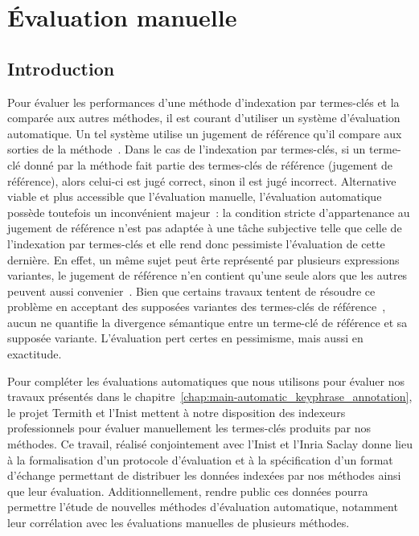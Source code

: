 \chapter{Évaluation manuelle}
\label{chap:main-manuelle_evaluation_of_keyphrase_annotation}

  \section{Introduction}
  \label{sec:main-automatic_evaluation_of_keyphrase_annotation-introduction}
    Pour évaluer les performances d'une méthode d'indexation par termes-clés et
    la comparée aux autres méthodes, il est courant d'utiliser un système
    d'évaluation automatique. Un tel système utilise un jugement de référence
    qu'il compare aux sorties de la méthode~\cite{voorhees2002philosophy}. Dans
    le cas de l'indexation par termes-clés, si un terme-clé donné par la méthode
    fait partie des termes-clés de référence (jugement de référence), alors
    celui-ci est jugé correct, sinon il est jugé incorrect. Alternative viable
    et plus accessible que l'évaluation manuelle, l'évaluation automatique
    possède toutefois un inconvénient majeur~: la condition stricte
    d'appartenance au jugement de référence n'est pas adaptée à une tâche
    subjective telle que celle de l'indexation par termes-clés et elle rend donc
    pessimiste l'évaluation de cette dernière. En effet, un même sujet peut êrte
    représenté par plusieurs expressions variantes, le jugement de référence
    n'en contient qu'une seule alors que les autres peuvent aussi
    convenier~\cite{hasan2014state_of_the_art}. Bien que certains travaux
    tentent de résoudre ce problème en acceptant des supposées variantes des
    termes-clés de référence~\cite{zesch2009rprecision,kim2010rprecision}, aucun
    ne quantifie la divergence sémantique entre un terme-clé de référence et sa
    supposée variante. L'évaluation pert certes en pessimisme, mais aussi en
    exactitude.
    
    Pour compléter les évaluations automatiques que nous utilisons pour évaluer
    nos travaux présentés dans le
    chapitre~\ref{chap:main-automatic_keyphrase_annotation}, le projet Termith
    et l'Inist mettent à notre disposition des indexeurs professionnels pour
    évaluer manuellement les termes-clés produits par nos méthodes. Ce travail,
    réalisé conjointement avec l'Inist et l'Inria Saclay donne lieu à la
    formalisation d'un protocole d'évaluation et à la spécification d'un format
    d'échange permettant de distribuer les données indexées par nos méthodes
    ainsi que leur évaluation. Additionnellement, rendre public ces données
    pourra permettre l'étude de nouvelles méthodes d'évaluation automatique,
    notamment leur corrélation avec les évaluations manuelles de plusieurs
    méthodes.

